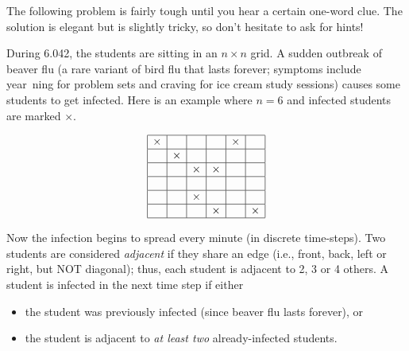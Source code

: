\documentclass[twoside,12pt]{article}
\begin{document}
\begin{problem}{12}
The following problem is fairly tough until you hear a certain
one-word clue. The solution is elegant but is slightly tricky, so don't hesitate to ask for hints!

During 6.042, the students are sitting in
an $n\times n$ grid. A sudden outbreak of beaver flu (a rare variant of bird flu that lasts forever; symptoms include year\
ning for problem sets and craving for ice cream study sessions) causes some students to get infected. Here is
an example where $n = 6$ and infected students are marked $\times$.

\[
\begin{array}{|c|c|c|c|c|c|}
\hline
\times& & & &\times & \\ \hline
 &\times& & & & \\ \hline
& &\times&\times& & \\ \hline
& & & & & \\ \hline
& &\times& & & \\ \hline
& & &\times& &\times \\ \hline
\end{array}
\]

\noindent Now the infection begins to spread every minute (in discrete time-steps). Two students are considered \textit{adjacent} if they
share an edge (i.e., front, back, left or right, but NOT diagonal); thus, each student is adjacent to 2, 3 or 4 others.  A
student is infected in the next time step if either

\begin{itemize}
\item the student was previously infected (since beaver flu lasts forever), or
\item the student is adjacent to \textit{at least two} already-infected students.
\end{itemize}


\end{problem}
\end{document}
